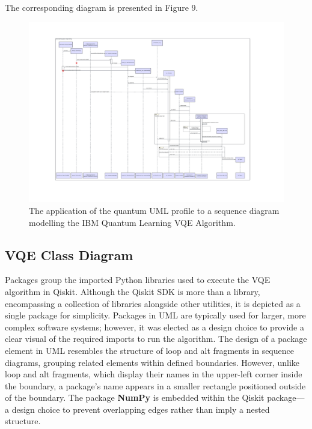 \documentclass{article}
\begin{document}
The corresponding diagram is presented in Figure 9.

\begin{figure}
    \centering
    \includegraphics[width=1\linewidth]{VQE UML Profile SD Final Version.pdf}
    \caption{The application of the quantum UML profile to a sequence diagram modelling the IBM Quantum Learning VQE Algorithm.}
    \label{fig:QUMLP_SD}
\end{figure}

\subsection{VQE Class Diagram}

Packages group the imported Python libraries used to execute the VQE algorithm in Qiskit. Although the Qiskit SDK is more than a library, encompassing a collection of libraries alongside other utilities\cite{SheriefAbul-Ezz}, it is depicted as a single package for simplicity. Packages in UML are typically used for larger, more complex software systems\cite{VisualParadigm}; however, it was elected as a design choice to provide a clear visual of the required imports to run the algorithm. The design of a package element in UML resembles the structure of loop and alt fragments in sequence diagrams, grouping related elements within defined boundaries. However, unlike loop and alt fragments, which display their names in the upper-left corner inside the boundary, a package’s name appears in a smaller rectangle positioned outside of the boundary. The package \textbf{NumPy} is embedded within the Qiskit package—a design choice to prevent overlapping edges rather than imply a nested structure.
\end{document}
